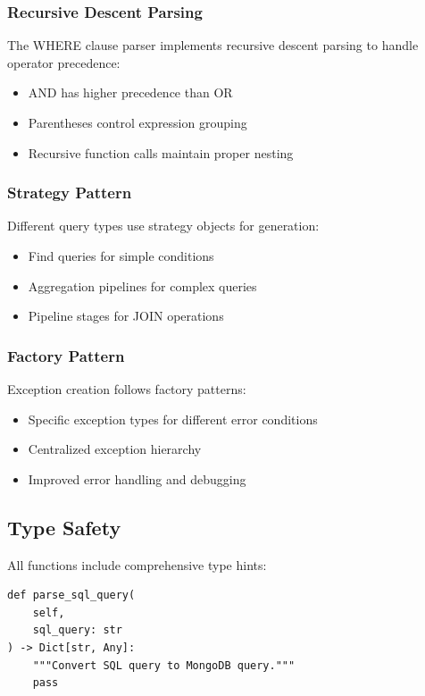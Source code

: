 \documentclass[12pt,a4paper]{article}
\begin{document}
\subsubsection{Recursive Descent Parsing}
The WHERE clause parser implements recursive descent parsing to handle operator precedence:
\begin{itemize}
    \item AND has higher precedence than OR
    \item Parentheses control expression grouping
    \item Recursive function calls maintain proper nesting
\end{itemize}

\subsubsection{Strategy Pattern}
Different query types use strategy objects for generation:
\begin{itemize}
    \item Find queries for simple conditions
    \item Aggregation pipelines for complex queries
    \item Pipeline stages for JOIN operations
\end{itemize}

\subsubsection{Factory Pattern}
Exception creation follows factory patterns:
\begin{itemize}
    \item Specific exception types for different error conditions
    \item Centralized exception hierarchy
    \item Improved error handling and debugging
\end{itemize}

\subsection{Type Safety}

All functions include comprehensive type hints:
\begin{lstlisting}
def parse_sql_query(
    self, 
    sql_query: str
) -> Dict[str, Any]:
    """Convert SQL query to MongoDB query."""
    pass
\end{lstlisting}
\end{document}
